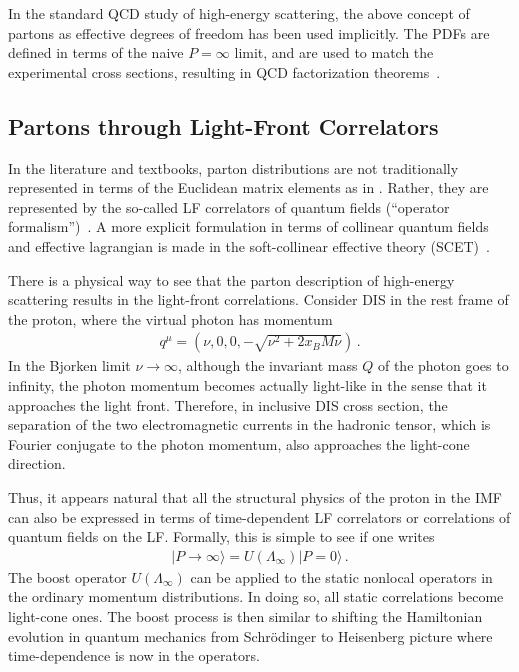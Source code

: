 In the standard QCD study of high-energy scattering,
the above concept of partons as effective degrees of freedom
has been used implicitly. The PDFs are defined in terms of the
naive $P=\infty$ limit, and are used to match the experimental cross sections,
resulting in QCD factorization theorems~\cite{Collins:2011zzd}.

\subsection{Partons through Light-Front Correlators}
\label{sec:lc-imf}

In the literature and textbooks, parton distributions are not traditionally represented
in terms of the Euclidean matrix elements as in .
Rather, they are represented by the so-called LF correlators of
quantum fields (``operator formalism'')~\cite{Brodsky:1997de,Collins:2011zzd}.
A more explicit formulation in terms of collinear quantum fields
and effective lagrangian is made in the soft-collinear effective theory (SCET)~\cite{Bauer:2000yr,Bauer:2001ct,Bauer:2001yt}.

There is a physical way to see that the parton description of high-energy scattering
results in the light-front correlations. Consider DIS in the rest
frame of the proton, where the virtual photon has momentum
\begin{align}
	q^\mu = (\nu, 0, 0,  -\sqrt{\nu^2+2x_B M\nu}) \,.
\end{align}
In the Bjorken limit $\nu\to\infty$, although the invariant mass $Q$ of the photon
goes to infinity, the photon momentum becomes actually light-like
in the sense that it approaches the light front.
Therefore, in inclusive DIS cross section, the separation of the two electromagnetic currents in the hadronic tensor, which is Fourier conjugate to the photon momentum, also approaches the light-cone direction.

Thus, it appears natural that
all the structural physics of the proton in the IMF can also be
expressed in terms of time-dependent LF correlators or
correlations of quantum fields on the LF. Formally, this is simple to see
if one writes
\begin{align}
	|P\to\infty\rangle = U(\Lambda_\infty) |P=0\rangle \,.
\end{align}
The boost operator $U(\Lambda_\infty)$ can be applied to
the static nonlocal operators in the ordinary momentum distributions.
In doing so, all static correlations become light-cone ones.
The boost process is then similar to shifting the Hamiltonian evolution
in quantum mechanics from Schr\"odinger to Heisenberg
picture where time-dependence is now in the operators.

